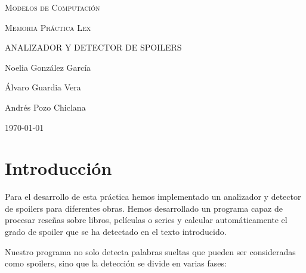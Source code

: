 \documentclass{article}
\begin{document}
\begin{titlepage}
    \centering
    
    {\scshape\LARGE Modelos de Computación\par}
    
    \vspace{1cm}
    
    {\scshape\Large Memoria Práctica Lex\par}
    
    \vspace{1.5cm}
    
    {\scshape\Large ANALIZADOR Y DETECTOR DE SPOILERS\par}
    
    \vfill
    
    {\Large Noelia González García\par}
    \vspace{0.2cm}
    {\Large Álvaro Guardia Vera\par}
    \vspace{0.2cm}
    {\Large Andrés Pozo Chiclana\par}
    
    \vfill
    
    {\large \today\par}
    
\end{titlepage}

\newpage
\tableofcontents
\newpage


\section{Introducción}

Para el desarrollo de esta práctica hemos implementado un analizador y detector de spoilers para diferentes obras. Hemos desarrollado un programa capaz de procesar reseñas sobre libros, películas o series y calcular automáticamente el grado de spoiler que se ha detectado en el texto introducido.

Nuestro programa no solo detecta palabras sueltas que pueden ser consideradas como spoilers, sino que la detección se divide en varias fases:
\end{document}
